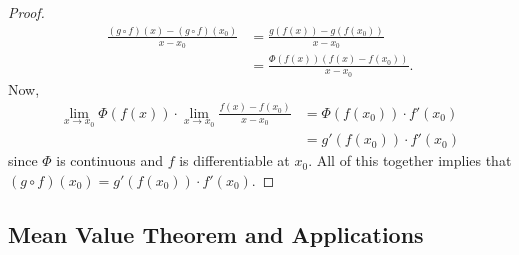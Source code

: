 \documentclass{article}
\newcommand{\?}{\stackrel{?}{=}}
\theoremstyle{definition} %
\begin{document}
\begin{itemize}
\begin{proof}
        \begin{align*}
            \frac{(g \circ f)(x) - (g \circ f)(x_0)}{x - x_0} &= \frac{g(f(x)) - g(f(x_0))}{x - x_0} \\
            &= \frac{\Phi(f(x))(f(x) - f(x_0))}{x - x_0}.
        \end{align*}
        Now,
        \begin{align*}
            \lim_{x \to x_0} \Phi(f(x)) \cdot \lim_{x \to x_0} \frac{f(x) - f(x_0)}{x - x_0} &= \Phi(f(x_0)) \cdot f'(x_0) \\
            &= g'(f(x_0)) \cdot f'(x_0)
        \end{align*}
        since $\Phi$ is continuous and $f$ is differentiable at $x_0$. All of this together implies that $(g \circ f)(x_0) = g'(f(x_0)) \cdot f'(x_0)$.
    \end{proof}
\end{itemize}

\subsection{Mean Value Theorem and Applications}
\end{document}

